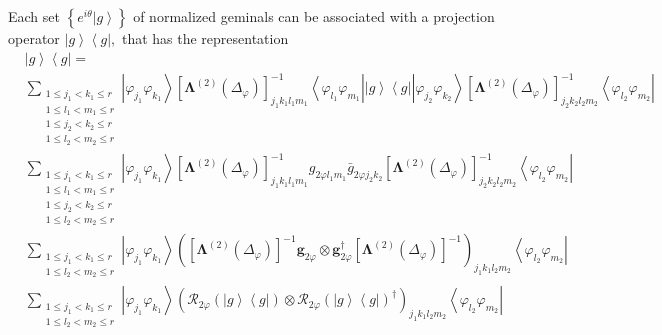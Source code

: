 \documentclass[aps,preprint]{revtex4}%
\begin{document}
Each set $\left\{  e^{i\theta}\left\vert g\right\rangle \right\}  $ of
normalized geminals can be associated with a projection operator $\left\vert
g\right\rangle \left\langle g\right\vert ,$ that has the representation%
\begin{align}
&  \left\vert g\right\rangle \left\langle g\right\vert =\\
&  \sum_{\substack{1\leq j_{1}<k_{1}\leq r\\1\leq l_{1}<m_{1}\leq r\\1\leq
j_{2}<k_{2}\leq r\\1\leq l_{2}<m_{2}\leq r}}\left\vert \varphi_{j_{1}}%
\varphi_{k_{1}}\right\rangle \left[  \mathbf{\Lambda}^{\left(  2\right)
}\left(  \Delta_{\varphi}\right)  \right]  _{j_{1}k_{1}l_{1}m_{1}}%
^{-1}\left\langle \varphi_{l_{1}}\varphi_{m_{1}}\right\vert \left\vert
g\right\rangle \left\langle g\right\vert \left\vert \varphi_{j_{2}}%
\varphi_{k_{2}}\right\rangle \left[  \mathbf{\Lambda}^{\left(  2\right)
}\left(  \Delta_{\varphi}\right)  \right]  _{j_{2}k_{2}l_{2}m_{2}}%
^{-1}\left\langle \varphi_{l_{2}}\varphi_{m_{2}}\right\vert \\
&  \sum_{\substack{1\leq j_{1}<k_{1}\leq r\\1\leq l_{1}<m_{1}\leq r\\1\leq
j_{2}<k_{2}\leq r\\1\leq l_{2}<m_{2}\leq r}}\left\vert \varphi_{j_{1}}%
\varphi_{k_{1}}\right\rangle \left[  \mathbf{\Lambda}^{\left(  2\right)
}\left(  \Delta_{\varphi}\right)  \right]  _{j_{1}k_{1}l_{1}m_{1}}%
^{-1}g_{2\varphi l_{1}m_{1}}\bar{g}_{2\varphi j_{2}k_{2}}\left[
\mathbf{\Lambda}^{\left(  2\right)  }\left(  \Delta_{\varphi}\right)  \right]
_{j_{2}k_{2}l_{2}m_{2}}^{-1}\left\langle \varphi_{l_{2}}\varphi_{m_{2}%
}\right\vert \\
&  \sum_{\substack{1\leq j_{1}<k_{1}\leq r\\1\leq l_{2}<m_{2}\leq
r}}\left\vert \varphi_{j_{1}}\varphi_{k_{1}}\right\rangle \left(  \left[
\mathbf{\Lambda}^{\left(  2\right)  }\left(  \Delta_{\varphi}\right)  \right]
^{-1}\mathbf{g}_{2\varphi}\otimes\mathbf{g}_{2\varphi}^{\dagger}\left[
\mathbf{\Lambda}^{\left(  2\right)  }\left(  \Delta_{\varphi}\right)  \right]
^{-1}\right)  _{j_{1}k_{1}l_{2}m_{2}}\left\langle \varphi_{l_{2}}%
\varphi_{m_{2}}\right\vert \\
&  \sum_{\substack{1\leq j_{1}<k_{1}\leq r\\1\leq l_{2}<m_{2}\leq
r}}\left\vert \varphi_{j_{1}}\varphi_{k_{1}}\right\rangle \left(
\mathcal{R}_{2\varphi}\left(  \left\vert g\right\rangle \left\langle
g\right\vert \right)  \otimes\mathcal{R}_{2\varphi}\left(  \left\vert
g\right\rangle \left\langle g\right\vert \right)  ^{\dagger}\right)
_{j_{1}k_{1}l_{2}m_{2}}\left\langle \varphi_{l_{2}}\varphi_{m_{2}}\right\vert
\end{align}
\end{document}
